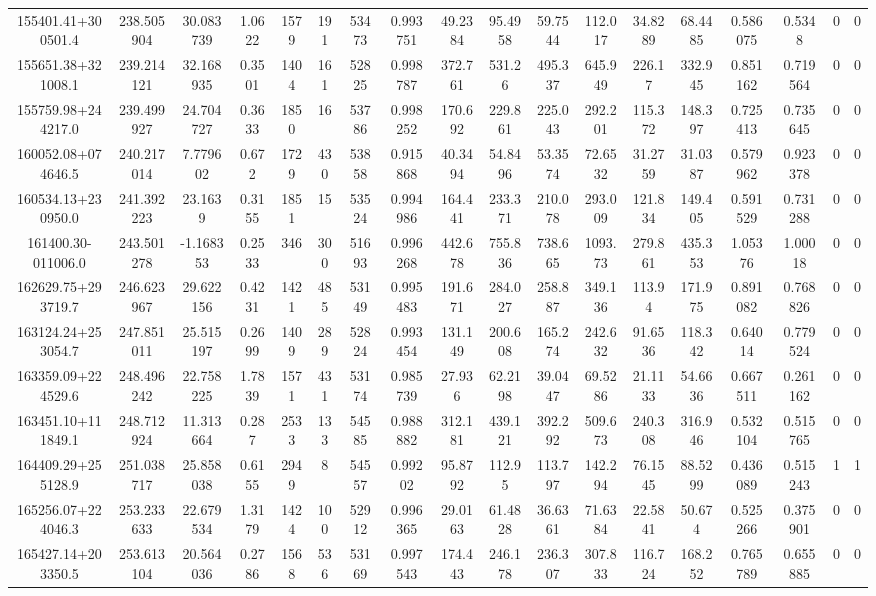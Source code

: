 \begin{table}
\begin{tabular}{cccccccccccccccccc}
155401.41+300501.4 & 238.505904 & 30.083739 & 1.0622 & 1579 & 191 & 53473 & 0.993751 & 49.2384 & 95.4958 & 59.7544 & 112.017 & 34.8289 & 68.4485 & 0.586075 & 0.5348 & 0 & 0 \\
155651.38+321008.1 & 239.214121 & 32.168935 & 0.3501 & 1404 & 161 & 52825 & 0.998787 & 372.761 & 531.26 & 495.337 & 645.949 & 226.17 & 332.945 & 0.851162 & 0.719564 & 0 & 0 \\
155759.98+244217.0 & 239.499927 & 24.704727 & 0.3633 & 1850 & 16 & 53786 & 0.998252 & 170.692 & 229.861 & 225.043 & 292.201 & 115.372 & 148.397 & 0.725413 & 0.735645 & 0 & 0 \\
160052.08+074646.5 & 240.217014 & 7.779602 & 0.672 & 1729 & 430 & 53858 & 0.915868 & 40.3494 & 54.8496 & 53.3574 & 72.6532 & 31.2759 & 31.0387 & 0.579962 & 0.923378 & 0 & 0 \\
160534.13+230950.0 & 241.392223 & 23.1639 & 0.3155 & 1851 & 15 & 53524 & 0.994986 & 164.441 & 233.371 & 210.078 & 293.009 & 121.834 & 149.405 & 0.591529 & 0.731288 & 0 & 0 \\
161400.30-011006.0 & 243.501278 & -1.168353 & 0.2533 & 346 & 300 & 51693 & 0.996268 & 442.678 & 755.836 & 738.665 & 1093.73 & 279.861 & 435.353 & 1.05376 & 1.00018 & 0 & 0 \\
162629.75+293719.7 & 246.623967 & 29.622156 & 0.4231 & 1421 & 485 & 53149 & 0.995483 & 191.671 & 284.027 & 258.887 & 349.136 & 113.94 & 171.975 & 0.891082 & 0.768826 & 0 & 0 \\
163124.24+253054.7 & 247.851011 & 25.515197 & 0.2699 & 1409 & 289 & 52824 & 0.993454 & 131.149 & 200.608 & 165.274 & 242.632 & 91.6536 & 118.342 & 0.64014 & 0.779524 & 0 & 0 \\
163359.09+224529.6 & 248.496242 & 22.758225 & 1.7839 & 1571 & 431 & 53174 & 0.985739 & 27.936 & 62.2198 & 39.0447 & 69.5286 & 21.1133 & 54.6636 & 0.667511 & 0.261162 & 0 & 0 \\
163451.10+111849.1 & 248.712924 & 11.313664 & 0.287 & 2533 & 133 & 54585 & 0.988882 & 312.181 & 439.121 & 392.292 & 509.673 & 240.308 & 316.946 & 0.532104 & 0.515765 & 0 & 0 \\
164409.29+255128.9 & 251.038717 & 25.858038 & 0.6155 & 2949 & 8 & 54557 & 0.99202 & 95.8792 & 112.95 & 113.797 & 142.294 & 76.1545 & 88.5299 & 0.436089 & 0.515243 & 1 & 1 \\
165256.07+224046.3 & 253.233633 & 22.679534 & 1.3179 & 1424 & 100 & 52912 & 0.996365 & 29.0163 & 61.4828 & 36.6361 & 71.6384 & 22.5841 & 50.674 & 0.525266 & 0.375901 & 0 & 0 \\
165427.14+203350.5 & 253.613104 & 20.564036 & 0.2786 & 1568 & 536 & 53169 & 0.997543 & 174.443 & 246.178 & 236.307 & 307.833 & 116.724 & 168.252 & 0.765789 & 0.655885 & 0 & 0 \\

\end{tabular}
\end{table}
